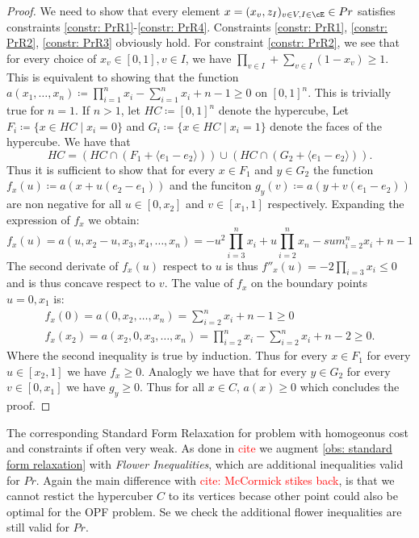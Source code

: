 \documentclass{article}
\begin{document}
\begin{proof}
We need to show that every element \(x = (x_v,z_I)_{v \in V,I\in \cE} \in Pr\) satisfies constraints \eqref{constr: PrR1}-\eqref{constr: PrR4}.
Constraints \eqref{constr: PrR1}, \eqref{constr: PrR2}, \eqref{constr: PrR3} obviously hold. For constraint \eqref{constr: PrR2}, we see that for every choice of \(x_v \in [0,1], v \in I\), we have \(\prod_{v \in I} + \sum_{v \in I}(1-x_v) \geq 1\).
This is equivalent to showing that the function \( a(x_1,\ldots,x_n) \coloneqq \prod_{i = 1}^n x_i - \sum_{i=1}^nx_i + n -1 \geq 0\) on \([0,1]^n\).
This is trivially true for \(n = 1\). If \(n > 1 \), let \(HC \coloneqq [0,1]^n \) denote the hypercube, Let \(F_i \coloneqq \{x \in HC \mid x_i = 0\}\) and \(G_i \coloneqq \{x \in HC \mid x_i = 1\}\) denote the faces of the hypercube. We have that \[ HC = (HC \cap (F_1 + \langle e_1 - e_2\rangle)) \cup (HC \cap (G_2 + \langle e_1 - e_2\rangle)).\]
Thus it is sufficient to show that for every \(x \in F_1\) and \(y \in G_2\) the function \(f_x(u) \coloneqq a(x + u(e_2 - e_1))\) and the funciton \(g_y(v) \coloneqq a(y + v(e_1 - e_2))\) are non negative for all \(u \in [0,x_2]\) and \(v \in [x_1, 1]\) respectively. Expanding the expression of \(f_x\) we obtain:
\[
f_x(u) = a( u, x_2 - u, x_3, x_4, \ldots, x_n) = - u^2 \prod_{i=3}^nx_i + u \prod_{i=2}^nx_n - sum_{i=2}^nx_i + n - 1
\]
The second derivate of \(f_x(u)\) respect to \(u\) is thus \(f''_x(u) = -2 \prod_{i = 3} x_i \leq 0\) and is thus concave respect to \(v\). The value of \(f_x\) on the boundary points \(u =0,x_1\) is:
\begin{align}
  f_x(0) = a(0, x_2, \ldots, x_n) = \sum_{i=2}^nx_i + n - 1  \geq 0 \\
  f_x(x_2) = a(x_2, 0 , x_3, \ldots, x_n) = \prod_{i=2}^nx_i - \sum_{i=2}^nx_i + n - 2 \geq 0.
\end{align}
Where the second inequality is true by induction. Thus for every \(x \in F_1\) for every \(u \in [x_2,1]\) we have \(f_x \geq 0\).
Analogly we have that for every \(y \in G_2\) for every \(v \in [0,x_1]\) we have \(g_y \geq 0\). Thus for all \(x \in C\), \(a(x) \geq 0\) which concludes the proof. 
\end{proof}

The corresponding Standard Form Relaxation for problem with homogeonus cost and constraints if often very weak. As done in \textcolor{red}{cite} we augment \ref{obs: standard form relaxation} with \emph{Flower Inequalities}, which are additional inequalities valid for \(Pr\).
Again the main difference with \textcolor{red}{cite: McCormick stikes back}, is that we cannot restict the hypercuber \(C\) to its vertices becase other point could also be optimal for the OPF problem. Se we check the additional flower inequalities are still valid for \(Pr\).
\end{document}
